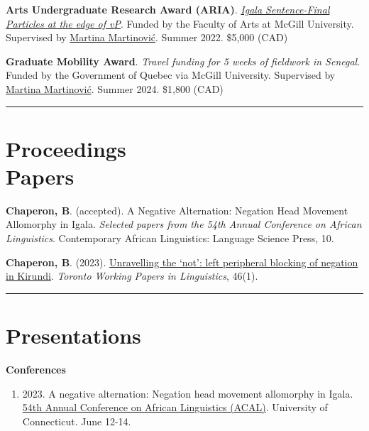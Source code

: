 \documentclass[margin,line]{resume}
\begin{document}
\begin{resume}
	 {\textbf{Arts Undergraduate Research Award (ARIA)}. \href{https://www.mcgill.ca/arts-internships/files/arts-internships/brandon_chaperon.pdf}{\textit{Igala Sentence-Final Particles at the edge of \textit{v}P}}. Funded by the Faculty of Arts at McGill University. Supervised by \href{https://inamartinovic.com/}{Martina Martinović}. Summer 2022. \$5,000 (CAD)}

	 {\textbf{Graduate Mobility Award}. \textit{Travel funding for 5 weeks of fieldwork in Senegal}. Funded by the Government of Quebec via McGill University. Supervised by \href{https://inamartinovic.com/}{Martina Martinović}. Summer 2024. \$1,800 (CAD)}


	\vspace{-0.5em}\rule{\textwidth}{0.4pt}


	\section{\mysidestyle Proceedings\\Papers}

	 {\textbf{Chaperon, B}. (accepted). A Negative Alternation: Negation Head Movement Allomorphy in Igala. \textit{Selected papers from the 54th Annual Conference on African Linguistics}. Contemporary African Linguistics: Language Science Press, 10.}

	 {\textbf{Chaperon, B}. (2023). \href{https://twpl.library.utoronto.ca/index.php/twpl/article/view/39257}{Unravelling the `not': left peripheral blocking of negation in Kirundi}. \textit{Toronto Working Papers in Linguistics}, 46(1).}%

	\vspace{-0.3em}\rule{\textwidth}{0.4pt}


	\section{\mysidestyle Presentations}

	\textbf{Conferences}
	\begin{enumerate}[-, leftmargin=1em, topsep=4pt]
		\item[] {2023. A negative alternation: Negation head movement allomorphy in Igala. \href{https://uconnuecs.cventevents.com/event/aef2d257-6a6a-41b5-b83d-2c6efc60aac5/summary}{54th Annual Conference on African Linguistics (ACAL)}. University of Connecticut. June 12-14.}


\end{enumerate}
\end{resume}
\end{document}
